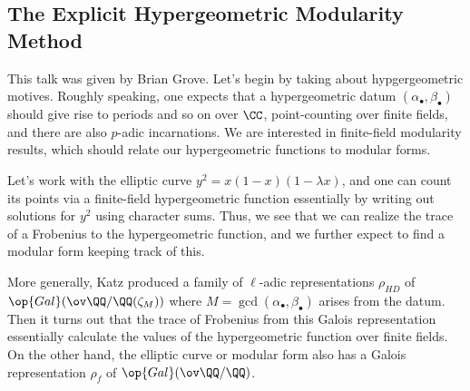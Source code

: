 \documentclass{article}
\begin{document}
\subsection{The Explicit Hypergeometric Modularity Method}
This talk was given by Brian Grove. Let's begin by taking about hypgergeometric motives. Roughly speaking, one expects that a hypergeometric datum $(\alpha_\bullet,\beta_\bullet)$ should give rise to periods and so on over $\CC$, point-counting over finite fields, and there are also $p$-adic incarnations. We are interested in finite-field modularity results, which should relate our hypergeometric functions to modular forms.

Let's work with the elliptic curve $y^2=x(1-x)(1-\lambda x)$, and one can count its points via a finite-field hypergeometric function essentially by writing out solutions for $y^2$ using character sums. Thus, we see that we can realize the trace of a Frobenius to the hypergeometric function, and we further expect to find a modular form keeping track of this.

More generally, Katz produced a family of $\ell$-adic representations $\rho_{HD}$ of $\op{Gal}(\ov\QQ/\QQ(\zeta_M))$ where $M=\gcd(\alpha_\bullet,\beta_\bullet)$ arises from the datum. Then it turns out that the trace of Frobenius from this Galois representation essentially calculate the values of the hypergeometric function over finite fields. On the other hand, the elliptic curve or modular form also has a Galois representation $\rho_f$ of $\op{Gal}(\ov\QQ/\QQ)$.
\end{document}
